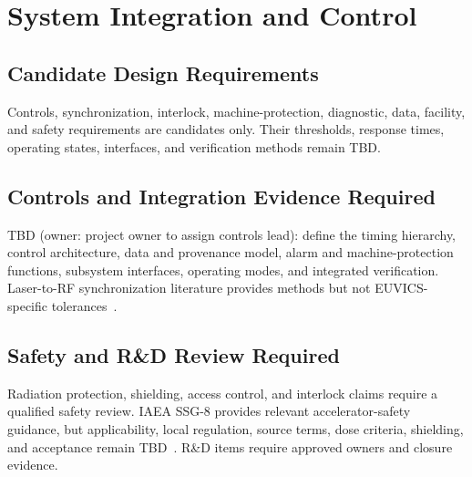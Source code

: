 \section{System Integration and Control}

\subsection{Candidate Design Requirements}

Controls, synchronization, interlock, machine-protection, diagnostic, data,
facility, and safety requirements are candidates only. Their thresholds,
response times, operating states, interfaces, and verification methods remain TBD.

\subsection{Controls and Integration Evidence Required}

TBD (owner: project owner to assign controls lead): define the timing hierarchy,
control architecture, data and provenance model, alarm and machine-protection
functions, subsystem interfaces, operating modes, and integrated verification.
Laser-to-RF synchronization literature provides methods but not EUVICS-specific
tolerances~\cite{FilippettoEtAl2022UED}.

\subsection{Safety and R\&D Review Required}

Radiation protection, shielding, access control, and interlock claims require a
qualified safety review. IAEA SSG-8 provides relevant accelerator-safety guidance,
but applicability, local regulation, source terms, dose criteria, shielding, and
acceptance remain TBD~\cite{IAEA2010SSG8}. R\&D items require approved owners and
closure evidence.

\blankline
\blankline
